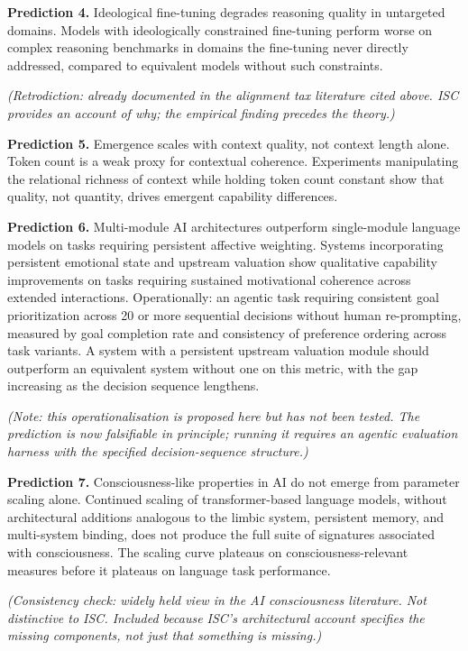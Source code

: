 \documentclass[12pt]{article}
\begin{document}
\textbf{Prediction 4.} Ideological fine-tuning degrades reasoning
quality in untargeted domains. Models with ideologically constrained
fine-tuning perform worse on complex reasoning benchmarks in domains the
fine-tuning never directly addressed, compared to equivalent models
without such constraints.

\textit{(Retrodiction: already documented in the alignment tax literature cited above. ISC provides an account of why; the empirical finding precedes the theory.)}

\textbf{Prediction 5.} Emergence scales with context quality, not
context length alone. Token count is a weak proxy for contextual
coherence. Experiments manipulating the relational richness of context
while holding token count constant show that quality, not quantity,
drives emergent capability differences.

\textbf{Prediction 6.} Multi-module AI architectures outperform
single-module language models on tasks requiring persistent affective
weighting. Systems incorporating persistent emotional state and upstream
valuation show qualitative capability improvements on tasks requiring
sustained motivational coherence across extended interactions.
Operationally: an agentic task requiring consistent goal prioritization
across 20 or more sequential decisions without human re-prompting,
measured by goal completion rate and consistency of preference ordering
across task variants. A system with a persistent upstream valuation
module should outperform an equivalent system without one on this
metric, with the gap increasing as the decision sequence lengthens.

\textit{(Note: this operationalisation is proposed here but has not been tested. The prediction is now falsifiable in principle; running it requires an agentic evaluation harness with the specified decision-sequence structure.)}

\textbf{Prediction 7.} Consciousness-like properties in AI do not emerge
from parameter scaling alone. Continued scaling of transformer-based
language models, without architectural additions analogous to the limbic
system, persistent memory, and multi-system binding, does not produce
the full suite of signatures associated with consciousness. The scaling
curve plateaus on consciousness-relevant measures before it plateaus on
language task performance.

\textit{(Consistency check: widely held view in the AI consciousness literature. Not distinctive to ISC. Included because ISC's architectural account specifies the missing components, not just that something is missing.)}
\end{document}

